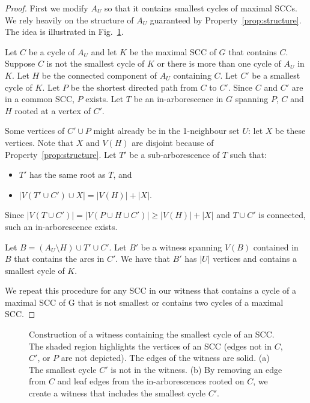 \documentclass[12pt]{article}
\begin{document}
\begin{proof}
First we modify $A_U$ so that it contains smallest cycles of maximal
SCCs.  We rely heavily on the structure of $A_U$ guaranteed by
Property~\ref{prop:structure}.  The idea is illustrated
in Fig.~\ref{fig:1-neighbour-structure}.

Let $C$ be a cycle of $A_U$ and let $K$ be the maximal SCC of $G$
that contains $C$.  Suppose $C$ is not the smallest cycle of $K$ or
there is more than one cycle of $A_U$ in $K$.  Let $H$ be the
connected component of $A_U$ containing $C$.  Let $C'$ be a smallest
cycle of $K$.  Let $P$ be the shortest directed path from $C$ to
$C'$.  Since $C$ and $C'$ are in a common SCC, $P$ exists.  Let $T$
be an in-arborescence in $G$ spanning $P$, $C$ and $H$ rooted at a
vertex of $C'$.

Some vertices of $C' \cup P$ might already be in the
1-neighbour set $U$: let $X$ be these vertices.  Note that $X$ and $V(H)$ are
disjoint because of Property~\ref{prop:structure}.  Let $T'$ be a
sub-arborescence of $T$ such that:
\begin{itemize}
\item $T'$ has the same root as $T$, and
\item $|V(T' \cup C') \cup X| = |V(H)|+|X|$.
\end{itemize}
Since $|V(T \cup C')| = |V(P\cup H \cup C')| \geq |V(H)| + |X|$ and
$T \cup C'$ is connected, such an in-arborescence exists.

Let $B = (A_U \setminus H) \cup T' \cup C'$.  Let $B'$ be a witness
spanning $V(B)$ contained in $B$ that contains the arcs in $C'$.  We
have that $B'$ has $|U|$ vertices and contains a smallest cycle of
$K$.

We repeat this procedure for any SCC in our witness that contains
a cycle of a maximal SCC of G that is not smallest or contains two
cycles of a maximal SCC.
\hfill  \end{proof}


\begin{figure}[tb]
\centering
{}
\caption{Construction of a witness containing the smallest cycle
of an SCC.  The shaded region highlights the vertices of an
SCC (edges not in $C$, $C'$, or $P$ are not depicted).  The edges of the witness are solid.  (a) The smallest
cycle $C'$ is not in the witness.  (b) By removing an edge from
$C$ and leaf edges from the in-arborescences rooted on $C$, we
create a witness that includes the smallest cycle $C'$.}
\label{fig:1-neighbour-structure}
\end{figure}
\end{document}

